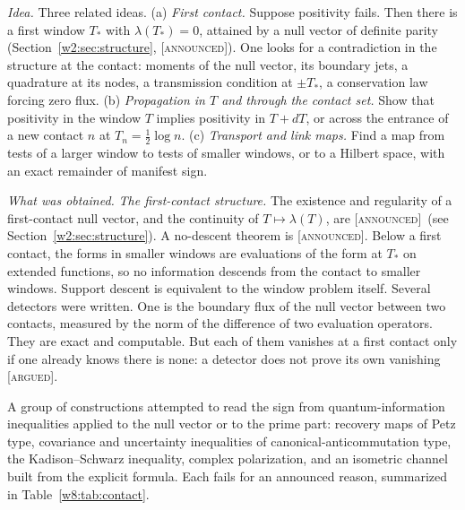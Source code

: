 \documentclass[11pt]{amsart}
\theoremstyle{definition}
\theoremstyle{remark}
\numberwithin{equation}{section}
\newcommand{\lam}{\lambda(T)}                          %
\newcommand{\Tst}{T_{*}}                               %
\newcommand{\stag}[1]{\textsc{[#1]}}
\newcommand{\ARGUED}{\stag{argued}}
\newcommand{\ANNOUNCED}{\stag{announced}}
\newcommand{\entry}[1]{\par\smallskip\noindent\textit{#1.}\enspace}
\begin{document}
\entry{Idea} Three related ideas.
(a) \emph{First contact.} Suppose positivity fails. Then there is a first window $\Tst$ with $\lambda(\Tst)=0$, attained
by a null vector of definite parity (Section~\ref{w2:sec:structure}, \ANNOUNCED). One looks for a contradiction in the
structure at the contact: moments of the null vector, its boundary jets, a quadrature at its nodes, a transmission
condition at $\pm\Tst$, a conservation law forcing zero flux.
(b) \emph{Propagation in $T$ and through the contact set.} Show that positivity in the window $T$ implies positivity in
$T+dT$, or across the entrance of a new contact $n$ at $T_n=\frac12\log n$.
(c) \emph{Transport and link maps.} Find a map from tests of a larger window to tests of smaller windows, or to a
Hilbert space, with an exact remainder of manifest sign.

\entry{What was obtained}
\emph{The first-contact structure.} The existence and regularity of a first-contact null vector, and the continuity of
$T\mapsto\lam$, are \ANNOUNCED\ (see Section~\ref{w2:sec:structure}). A no-descent theorem is \ANNOUNCED. Below a
first contact, the forms in smaller windows are evaluations of the form at $\Tst$ on extended functions, so no
information descends from the contact to smaller windows. Support descent is equivalent to the window problem itself.
Several detectors were written. One is the boundary flux of the null vector between two contacts, measured by the norm
of the difference of two evaluation operators. They are exact and computable. But each of them vanishes at a first
contact only if one already knows there is none: a detector does not prove its own vanishing \ARGUED.

A group of constructions attempted to read the sign from quantum-information inequalities applied to the null vector
or to the prime part: recovery maps of Petz type, covariance and uncertainty inequalities of
canonical-anticommutation type, the Kadison--Schwarz inequality, complex polarization, and an isometric channel built
from the explicit formula. Each fails for an announced reason, summarized in Table~\ref{w8:tab:contact}.
\end{document}
